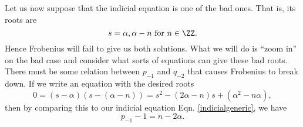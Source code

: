 Let us now suppose that the indicial equation is one of the bad ones. That is, its roots are 
\begin{equation}
    s=\alpha, \alpha-n\text{ for }n\in \ZZ.
\end{equation}
Hence Frobenius will fail to give us both solutions. What we will do is ``zoom in'' on the bad case and consider what sorts of equations can give these bad roots. There must be some relation between $p_{-1}$ and $q_{-2}$ that causes Frobenius to break down. If we write an equation with the desired roots
\begin{equation}
    0=(s-\alpha)(s-(\alpha-n)) = s^2 -(2\alpha -n)s +(\alpha^2 -n\alpha),
\end{equation}
then by comparing this to our indicial equation Eqn. \ref{indicialgeneric}, we have
\begin{equation}
    p_{-1} - 1 = n-2\alpha.
\end{equation}